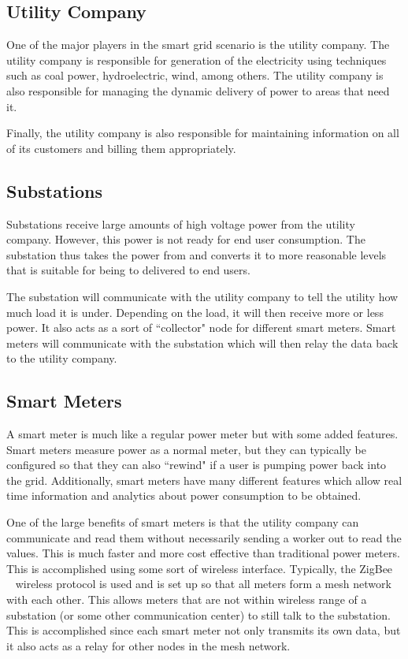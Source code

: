 \subsection{Utility Company}
One of the major players in the smart grid scenario is the utility company. The utility company is responsible for
generation of the electricity using techniques such as coal power, hydroelectric, wind, among others. The utility
company is also responsible for managing the dynamic delivery of power to areas that need it.

Finally, the utility company is also responsible for maintaining information on all of its customers and billing them
appropriately.

\subsection{Substations}
Substations receive large amounts of high voltage power from the utility company. However, this power is not ready
for end user consumption. The substation thus takes the power from and converts it to  more reasonable levels
that is suitable for being to delivered to end users.

The substation will communicate with the utility company to tell the utility how much load it is under. Depending on
the load, it will then receive more or less power. It also acts as a sort of ``collector" node for different smart meters.
Smart meters will communicate with the substation which will then relay the data back to the utility company.

\subsection{Smart Meters}
A smart meter is much like a regular power meter but with some added features. Smart meters measure power as
a normal meter, but they can typically be configured so that they can also ``rewind" if a user is pumping power back
into the grid. Additionally, smart meters have many different features which allow real time information and analytics
about power consumption to be obtained.

One of the large benefits of smart meters is that the utility company can communicate and read them without
necessarily sending a worker out to read the values. This is much faster and more cost effective than traditional
power meters. This is accomplished using some sort of wireless interface. Typically, the ZigBee~\cite{zigbee}
~\cite{aminetworking}
wireless protocol is used and is set up so that all meters form a mesh network with each other. This allows meters
that are not within wireless range of a substation (or some other communication center) to still talk to the substation.
This is accomplished since each smart meter not only transmits its own data, but it also acts as a relay for other nodes
in the mesh network.

